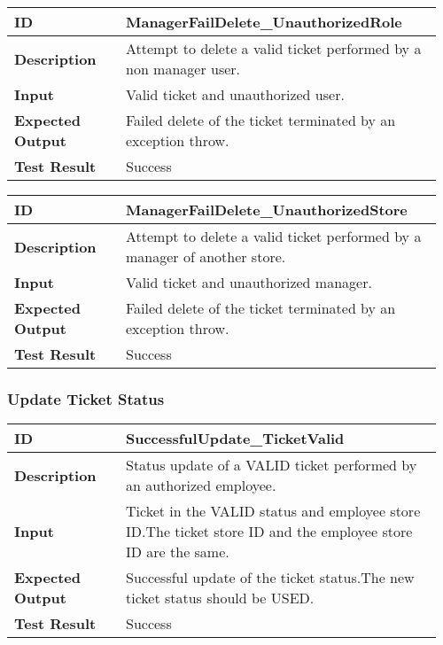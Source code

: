 \begin{table}[H]
	\centering
	\begin{tabular}{@{}p{0.25\linewidth}p{0.71\linewidth}@{}}
		\toprule
		\textbf{ID} & ManagerFailDelete\_UnauthorizedRole \\
		\midrule
		\textbf{Description} & Attempt to delete a valid ticket performed by a non manager user. \\
		\midrule
		\textbf{Input} & Valid ticket and unauthorized user.\\
		\midrule
		\textbf{Expected Output} & Failed delete of the ticket terminated by an exception throw.\\
		\midrule
		\textbf{Test Result} & Success\\
		\bottomrule
	\end{tabular}
\end{table}

\begin{table}[H]
	\centering
	\begin{tabular}{@{}p{0.25\linewidth}p{0.71\linewidth}@{}}
		\toprule
		\textbf{ID} & ManagerFailDelete\_UnauthorizedStore \\
		\midrule
		\textbf{Description} & Attempt to delete a valid ticket performed by a manager of another store. \\
		\midrule
		\textbf{Input} & Valid ticket and unauthorized manager.\\
		\midrule
		\textbf{Expected Output} & Failed delete of the ticket terminated by an exception throw.\\
		\midrule
		\textbf{Test Result} & Success\\
		\bottomrule
	\end{tabular}
\end{table}


\subsubsection{Update Ticket Status}
\begin{table}[H]
	\centering
	\begin{tabular}{@{}p{0.25\linewidth}p{0.71\linewidth}@{}}
		\toprule
		\textbf{ID} & SuccessfulUpdate\_TicketValid \\
		\midrule
		\textbf{Description} & Status update of a VALID ticket performed by an authorized employee. \\
		\midrule
		\textbf{Input} & Ticket in the VALID status and employee store ID.\newline The ticket store ID and the employee store ID are the same.\\
		\midrule
		\textbf{Expected Output} & Successful update of the ticket status.\newline The new ticket status should be USED. \\
		\midrule
		\textbf{Test Result} & Success\\
		\bottomrule
	\end{tabular}
\end{table}

